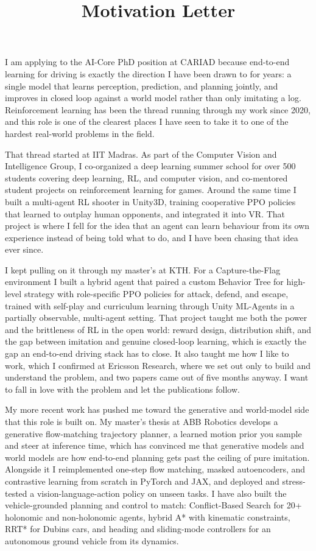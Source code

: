 \documentclass{article}
\title{Motivation Letter}
\begin{document}
  \maketitle
\vspace{7pt}


I am applying to the AI-Core PhD position at CARIAD because end-to-end learning for driving is exactly the direction I have been drawn to for years: a single model that learns perception, prediction, and planning jointly, and improves in closed loop against a world model rather than only imitating a log. Reinforcement learning has been the thread running through my work since 2020, and this role is one of the clearest places I have seen to take it to one of the hardest real-world problems in the field.

That thread started at IIT Madras. As part of the Computer Vision and Intelligence Group, I co-organized a deep learning summer school for over 500 students covering deep learning, RL, and computer vision, and co-mentored student projects on reinforcement learning for games. Around the same time I built a multi-agent RL shooter in Unity3D, training cooperative PPO policies that learned to outplay human opponents, and integrated it into VR. That project is where I fell for the idea that an agent can learn behaviour from its own experience instead of being told what to do, and I have been chasing that idea ever since.

I kept pulling on it through my master's at KTH. For a Capture-the-Flag environment I built a hybrid agent that paired a custom Behavior Tree for high-level strategy with role-specific PPO policies for attack, defend, and escape, trained with self-play and curriculum learning through Unity ML-Agents in a partially observable, multi-agent setting. That project taught me both the power and the brittleness of RL in the open world: reward design, distribution shift, and the gap between imitation and genuine closed-loop learning, which is exactly the gap an end-to-end driving stack has to close. It also taught me how I like to work, which I confirmed at Ericsson Research, where we set out only to build and understand the problem, and two papers came out of five months anyway. I want to fall in love with the problem and let the publications follow.

My more recent work has pushed me toward the generative and world-model side that this role is built on. My master's thesis at ABB Robotics develops a generative flow-matching trajectory planner, a learned motion prior you sample and steer at inference time, which has convinced me that generative models and world models are how end-to-end planning gets past the ceiling of pure imitation. Alongside it I reimplemented one-step flow matching, masked autoencoders, and contrastive learning from scratch in PyTorch and JAX, and deployed and stress-tested a vision-language-action policy on unseen tasks. I have also built the vehicle-grounded planning and control to match: Conflict-Based Search for 20+ holonomic and non-holonomic agents, hybrid A* with kinematic constraints, RRT* for Dubins cars, and heading and sliding-mode controllers for an autonomous ground vehicle from its dynamics.
\end{document}
